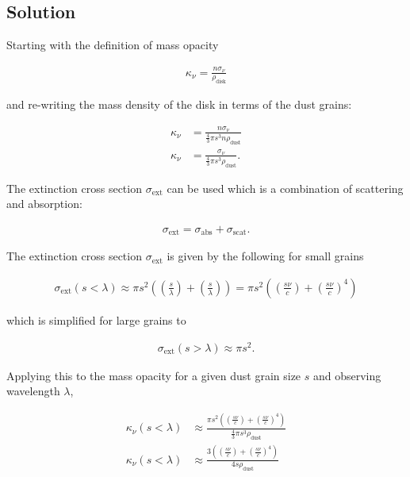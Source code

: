 \documentclass[12pt]{article}
\begin{document}
\subsection*{Solution}

Starting with the definition of mass opacity

\begin{align*}
\kappa_\nu = \frac{n \sigma_\nu}{\rho_\mathrm{disk}}
\end{align*}

and re-writing the mass density of the disk in terms of the dust grains:

\begin{equation*}
\begin{split}
\kappa_\nu &= \frac{n \sigma_\nu}{\frac{4}{3}\pi s^3 n\rho_\mathrm{dust}} \\
\kappa_\nu &= \frac{\sigma_\nu}{\frac{4}{3}\pi s^3 \rho_\mathrm{dust}}.
\end{split}
\end{equation*}

The extinction cross section $\sigma_\mathrm{ext}$ can be used which is a combination of scattering and absorption:
 
\begin{align*}
\sigma_\mathrm{ext} = \sigma_\mathrm{abs} + \sigma_\mathrm{scat}.
\end{align*}

The extinction cross section $\sigma_\mathrm{ext}$ is given by the following for small grains

\begin{equation*}
\begin{split}
\sigma_\mathrm{ext}(s<\lambda) \approx \pi s^2 \left(\left(\frac{s}{\lambda}\right) + \left(\frac{s}{\lambda}\right)\right) = \pi s^2 \left(\left(\frac{s\nu}{c}\right) + \left(\frac{s\nu}{c}\right)^4\right)
\end{split}
\end{equation*}

which is simplified for large grains to

\begin{align*}
\sigma_\mathrm{ext}(s>\lambda) \approx \pi s^2.
\end{align*}

Applying this to the mass opacity for a given dust grain size $s$ and observing wavelength $\lambda$, 

\begin{equation*}
\begin{split}
\kappa_\nu(s<\lambda) &\approx \frac{\pi s^2 \left(\left(\frac{s\nu}{c}\right) + \left(\frac{s\nu}{c}\right)^4\right)}{\frac{4}{3}\pi s^3 \rho_\mathrm{dust}} \\
\kappa_\nu(s<\lambda) &\approx \frac{3\left(\left(\frac{s\nu}{c}\right) + \left(\frac{s\nu}{c}\right)^4\right)}{4s \rho_\mathrm{dust}}
\end{split}
\end{equation*}
\end{document}
